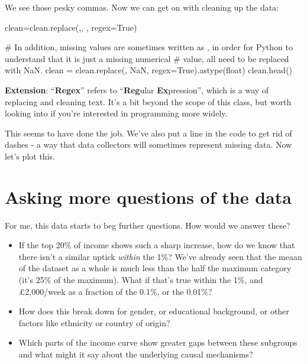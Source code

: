 \documentclass[
  letterpaper,
  DIV=11,
  numbers=noendperiod]{scrreprt}
\newenvironment{Shaded}{\begin{snugshade}}{\end{snugshade}}
\newcommand{\CommentTok}[1]{\textcolor[rgb]{0.37,0.37,0.37}{#1}}
\newcommand{\NormalTok}[1]{\textcolor[rgb]{0.00,0.23,0.31}{#1}}
\newcommand{\OperatorTok}[1]{\textcolor[rgb]{0.37,0.37,0.37}{#1}}
\newcommand{\StringTok}[1]{\textcolor[rgb]{0.13,0.47,0.30}{#1}}
\newcommand{\VariableTok}[1]{\textcolor[rgb]{0.07,0.07,0.07}{#1}}
\begin{document}
We see those pesky commas. Now we can get on with cleaning up the data:

\begin{Shaded}
\begin{Highlighting}[]
\NormalTok{clean}\OperatorTok{=}\NormalTok{clean.replace(}\StringTok{\textquotesingle{},\textquotesingle{}}\NormalTok{, }\StringTok{\textquotesingle{}\textquotesingle{}}\NormalTok{, regex}\OperatorTok{=}\VariableTok{True}\NormalTok{)}

\CommentTok{\# In addition, missing values are sometimes written as \textquotesingle{}{-}\textquotesingle{}, in order for Python to understand that it is just a missing numerical }
\CommentTok{\# value, all \textquotesingle{}{-}\textquotesingle{} need to be replaced with \textquotesingle{}NaN\textquotesingle{}.}
\NormalTok{clean }\OperatorTok{=}\NormalTok{ clean.replace(}\StringTok{\textquotesingle{}{-}\textquotesingle{}}\NormalTok{, }\StringTok{\textquotesingle{}NaN\textquotesingle{}}\NormalTok{, regex}\OperatorTok{=}\VariableTok{True}\NormalTok{).astype(}\StringTok{\textquotesingle{}float\textquotesingle{}}\NormalTok{)}
\NormalTok{clean.head()}
\end{Highlighting}
\end{Shaded}

\textbf{Extension}: ``\textbf{Regex}'' refers to ``\textbf{Reg}ular
\textbf{Ex}pression'', which is a way of replacing and cleaning text.
It's a bit beyond the scope of this class, but worth looking into if
you're interested in programming more widely.

This seems to have done the job. We've also put a line in the code to
get rid of dashes - a way that data collectors will sometimes represent
missing data. Now let's plot this.

\hypertarget{asking-more-questions-of-the-data}{%
\section{Asking more questions of the
data}\label{asking-more-questions-of-the-data}}

For me, this data starts to beg further questions. How would we answer
these?

\begin{itemize}
\item
  If the top 20\% of income shows such a sharp increase, how do we know
  that there isn't a similar uptick \emph{within} the 1\%? We've already
  seen that the meaan of the dataset as a whole is much less than the
  half the maximum category (it's 25\% of the maximum). What if that's
  true within the 1\%, and £2,000/week as a fraction of the 0.1\%, or
  the 0.01\%?
\item
  How does this break down for gender, or educational background, or
  other factors like ethnicity or country of origin?
\item
  Which parts of the income curve show greater gaps between these
  subgroups and what might it say about the underlying causal
  mechanisms?
\end{itemize}
\end{document}
